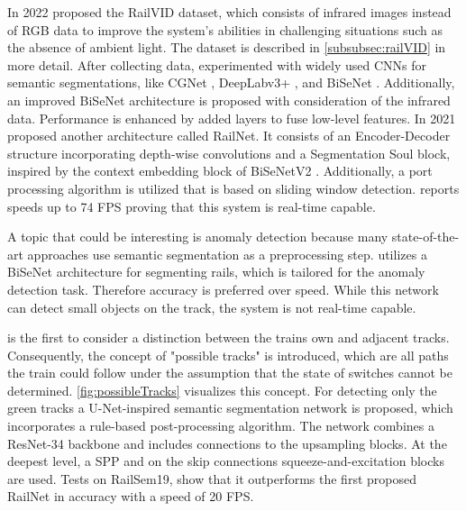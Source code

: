 In 2022 \cite{yuan2022railvid} proposed the RailVID dataset, which consists of infrared images instead of \ac{RGB} data to improve the system's abilities in challenging situations such as the absence of ambient light.
The dataset is described in \autoref{subsubsec:railVID} in more detail.
After collecting data, \cite{yuan2022railvid} experimented with widely used \ac{CNN}s for semantic segmentations, like \ac{CGNet} \cite{CGNet}, DeepLabv3+ \cite{DeepLabV3plus2018}, and \ac{BiSeNet} \cite{BiSeNet2019}.
Additionally, an improved BiSeNet architecture is proposed with consideration of the infrared data. Performance is enhanced by added layers to fuse low-level features.
In 2021 \cite{AccurateLightweightRailNet2021} proposed another architecture called RailNet.
It consists of an Encoder-Decoder structure incorporating depth-wise convolutions and a Segmentation Soul block, inspired by the context embedding block of \ac{BiSeNet}V2 \cite{BiSeNetV22021}.
Additionally, a port processing algorithm is utilized that is based on sliding window detection.
\cite{AccurateLightweightRailNet2021} reports speeds up to 74 \ac{FPS} proving that this system is real-time capable.

A topic that could be interesting is anomaly detection because many state-of-the-art approaches use semantic segmentation as a preprocessing step.
\cite{anomalyDetection2021} utilizes a \ac{BiSeNet} \cite{BiSeNet2019} architecture for segmenting rails, which is tailored for the anomaly detection task.
Therefore accuracy is preferred over speed.
While this network can detect small objects on the track, the system is not real-time capable.

\cite{RailraodSemanticPossibleTracks2020} is the first to consider a distinction between the trains own and adjacent tracks.
Consequently, the concept of "possible tracks" is introduced, which are all paths the train could follow under the assumption that the state of switches cannot be determined.
\autoref{fig:possibleTracks} visualizes this concept.
For detecting only the green tracks a U-Net-inspired \cite{uNet2015} semantic segmentation network is proposed, which incorporates a rule-based post-processing algorithm.
The network combines a ResNet-34 \cite{ResNet} backbone and includes connections to the upsampling blocks.
At the deepest level, a \ac{SPP} \cite{spatialPyramidPooling2014} and on the skip connections squeeze-and-excitation blocks \cite{SqueezeAndExcitation2019} are used.
Tests on RailSem19, show that it outperforms the first proposed RailNet \cite{railNet2019} in accuracy with a speed of 20 \ac{FPS}.

